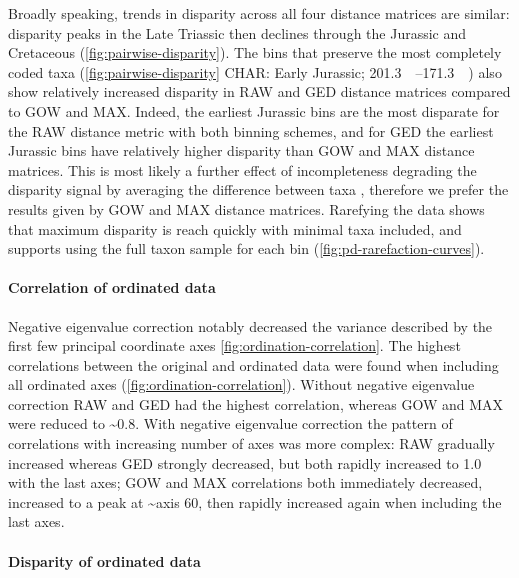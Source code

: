 \documentclass[british,a4paper]{article}
\newcommand\pcref[1]{(\cref{#1})}
\begin{document}
Broadly speaking, trends in disparity across all four distance matrices are
similar: disparity peaks in the Late Triassic then declines through the Jurassic
and Cretaceous \pcref{fig:pairwise-disparity}. The bins that preserve the most
completely coded taxa (\cref{fig:pairwise-disparity} CHAR\@: Early Jurassic;
\SIrange{201.3}{171.3}{\mega\annum}) also show relatively increased disparity in
RAW and GED distance matrices compared to GOW and MAX\@. Indeed, the earliest
Jurassic bins are the most disparate for the RAW distance metric with both
binning schemes, and for GED the earliest Jurassic bins have relatively higher
disparity than GOW and MAX distance matrices. This is most likely a further
effect of incompleteness degrading the disparity signal by averaging the
difference between taxa \autocite{FlannerySutherland2019PRSBBS, Lehmann2019P},
therefore we prefer the results given by GOW and MAX distance matrices.
Rarefying the data shows that maximum disparity is reach quickly with minimal
taxa included, and supports using the full taxon sample for each bin
\pcref{fig:pd-rarefaction-curves}.

\paragraph{Correlation of ordinated data}\label{par:pco-correlation}

Negative eigenvalue correction notably decreased the variance described by the
first few principal coordinate axes \cref{fig:ordination-correlation}. The
highest correlations between the original and ordinated data were found when
including all ordinated axes \pcref{fig:ordination-correlation}. Without
negative eigenvalue correction RAW and GED had the highest correlation, whereas
GOW and MAX were reduced to \textasciitilde{}0.8. With negative eigenvalue
correction the pattern of correlations with increasing number of axes was more
complex: RAW gradually increased whereas GED strongly decreased, but both
rapidly increased to 1.0 with the last axes; GOW and MAX correlations both
immediately decreased, increased to a peak at \textasciitilde{}axis 60, then
rapidly increased again when including the last axes.

\paragraph{Disparity of ordinated data}\label{par:ordinated-disparity}
\end{document}
